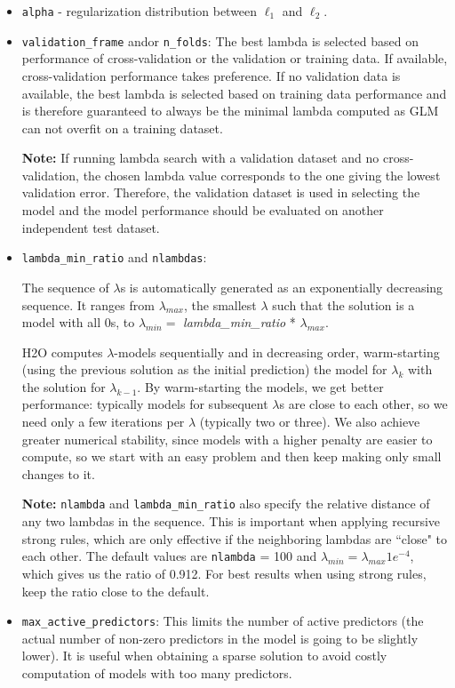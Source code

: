 \begin{itemize}
\item \texttt{alpha} - regularization distribution between  $\ell_1$ and  $\ell_2$.
\item \texttt{validation\_frame} and\/or \texttt{n\_folds}:
The best lambda is selected based on performance of cross-validation or the validation or training data. If available, cross-validation performance takes preference. If no validation data is available, the best lambda is selected based on training data performance and is therefore guaranteed to always be the minimal lambda computed as GLM can not overfit on a training dataset.
 
\textbf{Note:} If running lambda search with a validation dataset and no cross-validation, the chosen lambda value corresponds to the one giving the lowest validation error. Therefore, the validation dataset is used in selecting the model and the model performance should be evaluated on another independent test dataset. 

\item \texttt{lambda\_min\_ratio} and \texttt{nlambdas}: 

The sequence of $\lambda$s is automatically generated as an exponentially decreasing sequence. It ranges from $\lambda_{max}$,
the smallest $\lambda$ such that the solution is a model with all 0s, to $\lambda_{min} =
$ \textit{lambda\_min\_ratio} * $ \lambda_{max}$.

H2O computes $\lambda$-models sequentially and in decreasing order, warm-starting (using the previous solution as
the initial prediction) the model for $\lambda_k$ with the solution for $\lambda_{k-1}$. By warm-starting the
models, we get better performance: typically models for subsequent $\lambda$s are close to each other, so we need
only a few iterations per $\lambda$ (typically two or three). We also achieve greater numerical stability, since models
with a higher penalty are easier to compute, so we start with an easy problem and then keep making only small
changes to it.


\textbf{Note:} \texttt{nlambda} and \texttt{lambda\_min\_ratio} also specify the relative distance of any two
 lambdas in the sequence. This is important when applying recursive strong rules, which are only effective if the
neighboring lambdas are ``close" to each other. The default values are \texttt{nlambda} = 100 and $\lambda_{min}
= \lambda_{max} 1e^{-4}$, which gives us the ratio of 0.912.  For best results when using strong rules, keep the
ratio close to the default.

\item \texttt{max\_active\_predictors}: This limits the number of active predictors (the actual number of non-zero predictors in the model is going to be slightly lower). It is useful when obtaining a sparse solution to avoid costly computation of models with too many predictors.

\end{itemize}

